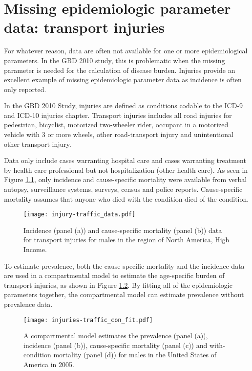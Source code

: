 \chapter{Missing epidemiologic parameter data: transport injuries}
\label{applications-double_dismod}

For whatever reason, data are often not available for one or more epidemiological parameters.  In the GBD 2010 study, this is problematic when the missing parameter is needed for the calculation of disease burden.  Injuries provide an excellent example of missing epidemiologic parameter data as incidence is often only reported.

In the GBD 2010 Study, injuries are defined as conditions codable to the ICD-9 and ICD-10 injuries chapter.  Transport injuries includes all road injuries for pedestrian, bicyclist, motorized two-wheeler rider, occupant in a motorized vehicle with 3 or more wheels, other road-transport injury and unintentional other transport injury.

Data only include cases warranting hospital care and cases warranting treatment by health care professional but not hospitalization (other health care).  As seen in Figure \ref{fig:app-injury traffic data}, only incidence and cause-specific mortality were available from verbal autopsy, surveillance systems, surveys, census and police reports.  Cause-specific mortality assumes that anyone who died with the condition died of the condition.

    \begin{figure}[h]
        \begin{center}
            \texttt{[image: injury-traffic\_data.pdf]}
            \caption{Incidence (panel (a)) and cause-specific mortality (panel (b)) data for transport injuries for males in the region of North America, High Income.}
            \label{fig:app-injury traffic data}
        \end{center}
    \end{figure}

To estimate prevalence, both the cause-specific mortality and the incidence data are used in a compartmental model to estimate the age-specific burden of transport injuries, as shown in Figure \ref{fig:app-injury traffic fit}.  By fitting all of the epidemiologic parameters together, the compartmental model can estimate prevalence without prevalence data.

    \begin{figure}[h]
        \begin{center}
            \texttt{[image: injuries-traffic\_con\_fit.pdf]}
            \caption{A compartmental model estimates the prevalence (panel (a)), incidence (panel (b)), cause-specific mortality (panel (c)) and with-condition mortality (panel (d)) for males in the United States of America in 2005.}
            \label{fig:app-injury traffic fit}
        \end{center}
    \end{figure}

